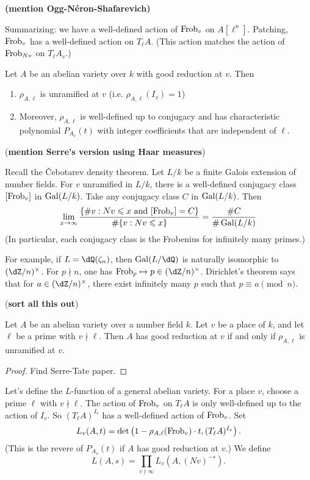 \textbf{(mention Ogg-N\'eron-Shafarevich)}

Summarizing: we have a well-defined action of $\mathrm{Frob}_v$ on $A[\ell^n]$. 
Patching, $\mathrm{Frob}_v$ has a well-defined action on $T_\ell A$. (This action 
matches the action of $\mathrm{Frob}_{N v}$ on $T_\ell A_v$.) 

\begin{theorem}
Let $A$ be an abelian variety over $k$ with good reduction at $v$. Then 
\begin{enumerate}
  \item $\rho_{A,\ell}$ is unramified at $v$ (i.e. $\rho_{A,\ell}(I_v) = 1$) 
  \item Moreover, $\rho_{A,\ell}$ is well-defined up to conjugacy and has 
    characteristic polynomial $P_{A_v}(t)$ with integer coefficients that are 
    independent of $\ell$. 
\end{enumerate}
\end{theorem}

(\textbf{mention Serre's version using Haar measures})

Recall the \v Cebotarev density theorem. Let $L/k$ be a finite Galois extension 
of number fields. For $v$ unramified in $L/k$, there is a well-defined 
conjugacy class $[\mathrm{Frob}_v]$ in $\operatorname{Gal}(L/k)$. Take any conjugacy class $C$ in 
$\operatorname{Gal}(L/k)$. Then 
\[
  \lim_{x \to \infty} \frac{\{\# v : N v \leqslant x \text{ and } [\mathrm{Frob}_v]=C\}}{\# \{v:N v\leqslant x\}} = \frac{\# C}{\# \operatorname{Gal}(L/k)}
\]
(In particular, each conjugacy class is the Frobenius for infinitely many 
primes.) 

For example, if $L=\dQ(\zeta_n)$, then $\gal(L/\dQ)$ is naturally isomorphic to 
$(\dZ/n)^\times$. For $p\nmid n$, one has $\frob_p \mapsto p\in (\dZ/n)^\times$. 
Dirichlet's theorem says that for $a\in (\dZ/n)^\times$, there exist infinitely 
many $p$ such that $p\equiv a\pmod n$. 

(\textbf{sort all this out})

\begin{theorem}
Let $A$ be an abelian variety over a number field $k$. Let $v$ be a place of 
$k$, and let $\ell$ be a prime with $v\nmid \ell$. Then $A$ has good reduction 
at $v$ if and only if $\rho_{A,\ell}$ is unramified at $v$. 
\end{theorem}
\begin{proof}
Find Serre-Tate paper.
\end{proof}

Let's define the $L$-function of a general abelian variety. For a place $v$, 
choose a prime $\ell$ with $v\nmid \ell$. The action of 
$\mathrm{Frob}_v$ on $T_\ell A$ is only well-defined up to the action of 
$I_v$. So $(T_\ell A)^{I_v}$ has a well-defined action of $\mathrm{Frob}_v$. Set 
\[
  L_v(A,t) = \det\left(1-\rho_{A,\ell}(\mathrm{Frob}_v)\cdot t,(T_\ell A)^{I_v}\right) \text{.}
\]
(This is the revere of $P_{A_v}(t)$ if $A$ has good reduction at $v$.) We define 
\[
  L(A,s) = \prod_{v\nmid \infty} L_v(A,(N v)^{-s}) \text{.}
\]

